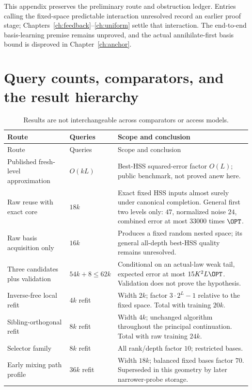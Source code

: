 \documentclass[11pt,oneside,openany,a4paper]{book}
\numberwithin{equation}{chapter}
\theoremstyle{definition}
\theoremstyle{remark}
\begin{document}
\begin{scopebox}
This appendix preserves the preliminary route and obstruction ledger. Entries calling the fixed-space predictable interaction unresolved record an earlier proof stage; Chapters~\ref{ch:feedback}--\ref{ch:uniform} settle that interaction. The end-to-end basis-learning premise remains unproved, and the actual annihilate-first basis bound is disproved in Chapter~\ref{ch:anchor}.
\end{scopebox}
\section{Query counts, comparators, and the result hierarchy}\label{base:new:ledger}
\begin{longtable}{@{}>{\RaggedRight\arraybackslash}p{.29\linewidth}>{\RaggedRight\arraybackslash}p{.18\linewidth}>{\RaggedRight\arraybackslash}p{.46\linewidth}@{}}
\caption{Results are not interchangeable across comparators or access models.}\label{base:tab:paper-comparison}\\
\toprule Route&Queries&Scope and conclusion\\\midrule\endfirsthead
\toprule Route&Queries&Scope and conclusion\\\midrule\endhead
\bottomrule\endfoot
Published fresh-level approximation&$O(kL)$&Best-HSS squared-error factor $O(L)$; public benchmark, not proved anew here.\\
Raw reuse with exact core&$18k$&Exact fixed HSS inputs almost surely under canonical completion. General first two levels only: $47$, normalized noise $24$, combined error at most $33000$ times $\OPT$.\\
Raw basis acquisition only&$16k$&Produces a fixed random nested space; its general all-depth best-HSS quality remains unresolved.\\
Three candidates plus validation&$54k+8\le62k$&Conditional on an actual-law weak tail, expected error at most $15K^2L\OPT$. Validation does not prove the hypothesis.\\
Inverse-free local refit&$4k$ refit&Width $2k$; factor $3\cdot2^L-1$ relative to the fixed space. Total with training $20k$.\\
Sibling-orthogonal refit&$8k$ refit&Width $4k$; unchanged algorithm throughout the principal continuation. Total with raw training $24k$.\\
Selector family&$8k$ refit&All rank/depth factor $10$; restricted bases.\\
Early mixing path profile&$36k$ refit&Width $18k$; balanced fixed bases factor $70$. Superseded in this geometry by later narrower-probe storage.\\

\end{longtable}
\end{document}
